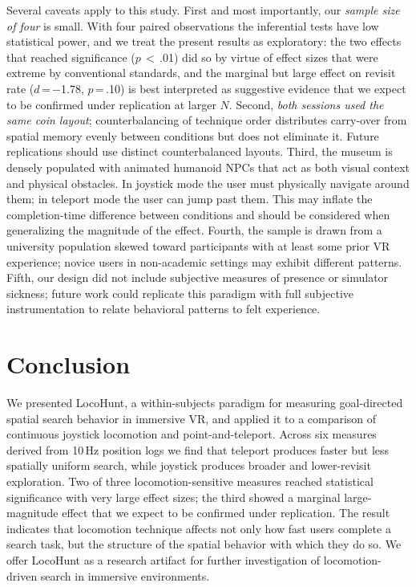 \documentclass{vgtc}
\begin{document}
Several caveats apply to this study. First and most importantly, our \emph{sample size of four} is small. With four paired observations the inferential tests have low statistical power, and we treat the present results as exploratory: the two effects that reached significance ($p$\,$<$\,.01) did so by virtue of effect sizes that were extreme by conventional standards, and the marginal but large effect on revisit rate ($d$\,=\,$-$1.78, $p$\,=\,.10) is best interpreted as suggestive evidence that we expect to be confirmed under replication at larger $N$. Second, \emph{both sessions used the same coin layout}; counterbalancing of technique order distributes carry-over from spatial memory evenly between conditions but does not eliminate it. Future replications should use distinct counterbalanced layouts. Third, the museum is densely populated with animated humanoid NPCs that act as both visual context and physical obstacles. In joystick mode the user must physically navigate around them; in teleport mode the user can jump past them. This may inflate the completion-time difference between conditions and should be considered when generalizing the magnitude of the effect. Fourth, the sample is drawn from a university population skewed toward participants with at least some prior VR experience; novice users in non-academic settings may exhibit different patterns. Fifth, our design did not include subjective measures of presence or simulator sickness; future work could replicate this paradigm with full subjective instrumentation to relate behavioral patterns to felt experience.

\section{Conclusion}

We presented LocoHunt, a within-subjects paradigm for measuring goal-directed spatial search behavior in immersive VR, and applied it to a comparison of continuous joystick locomotion and point-and-teleport. Across six measures derived from 10\,Hz position logs we find that teleport produces faster but less spatially uniform search, while joystick produces broader and lower-revisit exploration. Two of three locomotion-sensitive measures reached statistical significance with very large effect sizes; the third showed a marginal large-magnitude effect that we expect to be confirmed under replication. The result indicates that locomotion technique affects not only how fast users complete a search task, but the structure of the spatial behavior with which they do so. We offer LocoHunt as a research artifact for further investigation of locomotion-driven search in immersive environments.





\end{document}
